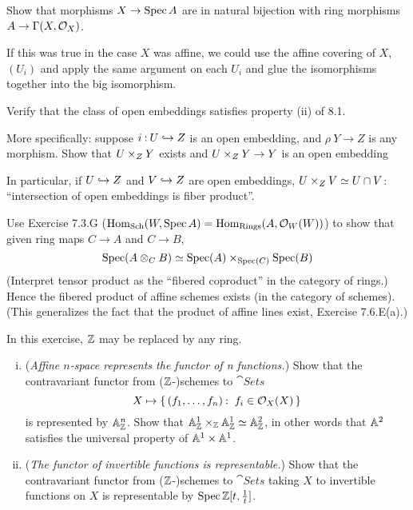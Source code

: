 \documentclass[12pt]{memoir}
\begin{document}
\begin{Ej}[7.3.G Vakil]
    Show that morphisms $X\to\operatorname{Spec} A$ are in natural bijection with ring morphisms $A\to\Gamma(X,\mathcal{O}_X)$. 
\end{Ej}

\begin{ptcbr}
If this was true in the case $X$ was affine, we could use the affine covering of $X$, $(U_i)$ and apply the same argument on each $U_i$ and glue the isomorphisms together into the big isomorphism.
\end{ptcbr}

\begin{Ej}[8.1.D Vakil]
    Verify that the class of open embeddings satisfies property (ii) of 8.1.\par
    More specifically: suppose $i\mathbin{:} U\hookrightarrow Z$ is an open embedding, and $\rho\: Y\to Z$ is any morphism. Show that $U\times_ZY$ exists and $U\times_ZY\to Y$ is an open embedding
    \par
    In particular, if $U\hookrightarrow Z$ and $V\hookrightarrow Z$ are open embeddings, $U\times_ZV\simeq U\cap V$: “intersection of open embeddings is fiber product”.
\end{Ej}

\begin{Ej}[10.1.A]
    Use Exercise 7.3.G ($\operatorname{Hom}_{\text{Sch}}(W,\operatorname{Spec} A)=\operatorname{Hom}_{\text{Rings}}(A,\mathcal{O}_W(W))$) to show that given ring maps $C\to A$ and $C\to B$,
    $$\operatorname{Spec}(A\otimes_CB)\simeq \operatorname{Spec}(A)\times_{\operatorname{Spec}(C)}\operatorname{Spec}(B)$$
    (Interpret tensor product as the ``fibered coproduct'' in the category of rings.) Hence the fibered product of affine schemes exists (in the category of schemes). (This generalizes the fact that the product of affine lines exist, Exercise 7.6.E(a).)
\end{Ej}

\begin{Ej}[7.6.E]
    In this exercise, $\mathbb{Z}$ may be replaced by any ring. 
    \begin{enumerate}[i)]
        \itemsep=-0.4em
        \item  (\emph{Affine $n$-space represents the functor of n functions.}) Show that the contravariant functor from ($\mathbb{Z}$-)schemes to $\cat{Sets}$
        $$X\mapsto\set{(f_1,\dots,f_n)\:\ f_i\in\cO_X(X)}$$
        is represented by $\mathbb{A}^n_{\mathbb{Z}}$. Show that $\mathbb{A}_{\mathbb{Z}}^1\times_{\mathbb{Z}}\mathbb{A}_{\mathbb{Z}}^1\simeq\mathbb{A}^2_{\mathbb{Z}}$, in other words that $\mathbb{A}^2$ satisfies the universal property of $\mathbb{A}^1\times\mathbb{A}^1$. 
        \item (\emph{The functor of invertible functions is representable.}) Show that the contravariant functor from ($\mathbb{Z}$-)schemes to $\cat{Sets}$ taking $X$ to invertible functions on $X$ is representable by $\operatorname{Spec}\mathbb{Z}[t,\frac{1}{t}]$.

    \end{enumerate}
\end{Ej}
\end{document}
